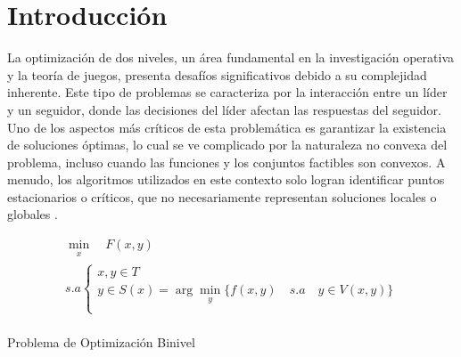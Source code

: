 \chapter{Introducción}
La optimización de dos niveles, un área fundamental en la investigación operativa y la teoría de juegos, presenta desafíos significativos debido a su complejidad inherente. Este tipo de problemas se caracteriza por la interacción entre un líder y un seguidor, donde las decisiones del líder afectan las respuestas del seguidor. Uno de los aspectos más críticos de esta problemática es garantizar la existencia de soluciones óptimas, lo cual se ve complicado por la naturaleza no convexa del problema, incluso cuando las funciones y los conjuntos factibles son convexos. A menudo, los algoritmos utilizados en este contexto solo logran identificar puntos estacionarios o críticos, que no necesariamente representan soluciones locales o globales \cite{DempeyZemkoho2020}.

\begin{table}[H]

    \[\begin{array}{l}
        \underset{\substack{x}}{\min} \quad F(x, y)\\
        s.a \left\{ \begin{array}{l}
            x,y \in T \\
             y \in S(x) = \arg  \underset{\substack{y}}{\min} \{ f(x, y) \quad s.a \quad y \in  V(x, y) \}\\
           
        \end{array}\right.
    \end{array}\]\\


    \caption*{Problema de Optimización Binivel}
    \end{table}

